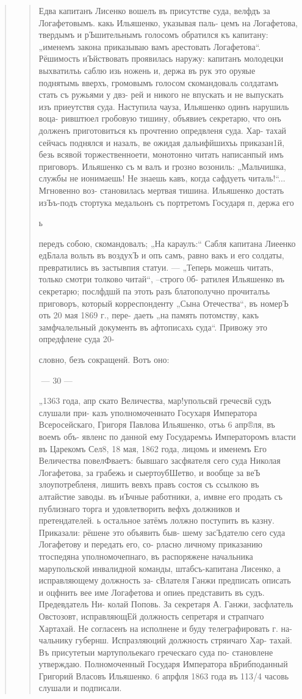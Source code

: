 \begin{quote}
\begin{quote}
Едва капитанъ Лисенко вошелъ въ присутстве суда,
велфдъ за Логафетовымъ. какь Ильяшенко, указывая паль-
цемъ на Логафетова, твердымъ и рЪшительнымъ голосомъ
обратился къ капитану: „именемъ закона приказываю вамъ
арестовать Логафетова“. Рёшимость иЪйствовать проявилась
наружу: капитанъ молодецки выхватилъь саблю изь ножень
и, держа въ рук это оруяые поднятымь вверхъ, громовымъ
голосом скомандоваль солдатамъ стать съ ружьями у двз-
рей и никого не впускать и не выпускать изъ приеутствя
суда. Наступила чауза, Ильяшенко одинъ нарушиль воца-
ривштюел гробовую тишину, объявиеъ секретарю, что онъ
долженъ приготовиться къ прочтенио опредвленя суда. Хар-
тахай сейчась поднялся и назалъ, ве ожидая дальифйшихъь
приказан1й, безь всявой торжественноети, монотонно читать
написанпый имъ приговоръ. Ильяшенко съ м%
валъ и грозно возониль: „Мальчишка, службы не ионимаешь!
Не знаешь кавъ, когда сафдуеть читаль!“... Мгновенно воз-
становилась мертвая тишина. Ильяшенко достать изЪъ-подъ
стортука медальонъ съ портретомъ Государя п, держа его

ь

передъ собою, скомандовалъ; „На караулъ:“ Сабля капитана
Лиеенко едБлала вольть въ воздухЪ и опъ самъ, равно вакъ
и его солдаты, превратились въ застывпия статуи. — „Теперь
можешь читать, только смотри толково читай“, --строго 0б-
ратилея Ильяшенко въ секретарю; послфдшй па этоть разъ
блатополучно прочиталъь приговоръ, который корреспонденту
„Сына Отечества“, въ номерЪ оть 20 мая 1869 г., пере-
даеть „на память потомству, какъ замфчалельный документь
въ афтописахь суда“. Привожу это опредфлене суда 20-

словно, безъ сокращенй. Вотъ оно:

— 30 —

„1363 года, апр%
скато Величества, мар!упольсвй гречесвй судъ слушали при-
казъ уполномоченнато Госухаря Императора Всеросейскаго,
Григоря Павлова Ильяшенко, отъь 6 апр®ля, въ воемъ объ-
явленс по данной ему Государемъь Императоромъ власти въ
Царекомъ Сел8, 18 мая, 1862 года, лицомь и именемъ
Его Величества повелФваетъ: бывшаго засфяателя сего суда
Николая Логафетова, за грабежь и сыертоубШетво, и вообще
за веЪ злоупотребленя, лишить вевхъ правъ состоя съ
ссылкою въ алтайстие заводы. въ иЪчные работники, а, имвне
его продать съ публизнаго торга и удовлетворить вефхъ
должников и претендателей. ь остальное затёмъ лолжно
поступить въ казну. Приказали: рёшене это объявить быв-
шему засЪдателю сего суда Логафетову и передать его, со-
рласно личному приказанию тгоспедяна уполномочепнаго, въ
распоряжене начальника марупольской инвалидной команды,
штабсъ-капитана Лисенко, а исправляющему должность за-
сВлателя Ганжи предписать описать и оцфнить вее име
Логафетова и опиеь представить въ судъ. Предевдатель Ни-
колай Поповь. За секретаря А. Ганжи, засфлатель Овстозовт,
исправляющЕй должность сепретаря и страпчаго Хартахай.
Не согласенъ на исполнене и буду телеграфировать г. на-
чальнику губернш. Испразляюций должность стряичаго Хар-
тахай. Въ присутетыи мартупольекаго греческаго суда по-
становлене утверждаю. Полномоченный Государя Императора
вБрибподанный Григорий Власовъ Ильяшенко. 6 апрфля 1863
года въ 113/4 часовь слушали и подписали.


\end{quote}
\end{quote}
